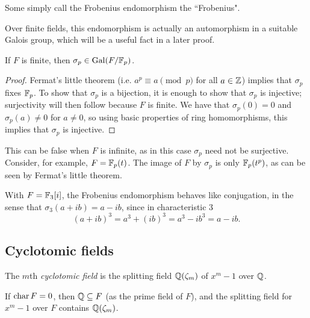 \begin{remark}
    Some simply call the Frobenius endomorphism the ``Frobenius".
\end{remark}

Over finite fields, this endomorphism is actually an automorphism in a suitable Galois group, which will be a useful fact in a later proof.

\begin{lemma}
    If $F$ is finite, then $\sigma_p \in \operatorname{Gal}(F/\mathbb{{F}}_p)$.
\end{lemma}

\begin{proof}
    Fermat's little theorem (i.e. $a^p \equiv a \pmod{p}$ for all $a \in \mathbb{{Z}}$) implies that $\sigma_p$ fixes $\mathbb{{F}}_p$. To show that $\sigma_p$ is a bijection, it is enough to show that $\sigma_p$ is injective; surjectivity will then follow because $F$ is finite. We have that $\sigma_p(0) = 0$ and $\sigma_p(a) \neq 0$ for $a \neq 0$, so using basic properties of ring homomorphisms, this implies that $\sigma_p$ is injective.
\end{proof}

\begin{remark}
    This can be false when $F$ is infinite, as in this case $\sigma_p$ need not be surjective. Consider, for example, $F = \mathbb{{F}}_p(t)$. The image of $F$ by $\sigma_p$ is only $\mathbb{{F}}_p(t^p)$, as can be seen by Fermat's little theorem.
\end{remark}

\begin{example}
    With $F = \mathbb{{F}}_3[i]$, the Frobenius endomorphism behaves like conjugation, in the sense that $\sigma_3(a + ib) = a - ib$, since in characteristic 3
    \[
        (a + ib)^3 = a^3 + (ib)^3 = a^3 - ib^3 = a - ib.
    \]
\end{example}

\subsection{Cyclotomic fields}

\begin{definition}
   The $m$th \emph{cyclotomic field} is the splitting field $\mathbb{{Q}}(\zeta_m)$ of $x^m - 1$ over $\mathbb{{Q}}$.
\end{definition}

\begin{remark}
    If $\operatorname{char}{{F}} = 0$, then $\mathbb{{Q}} \subseteq F$ (as the prime field of $F$), and the splitting field for $x^m - 1$ over $F$ contains $\mathbb{{Q}}(\zeta_m)$.
\end{remark}

